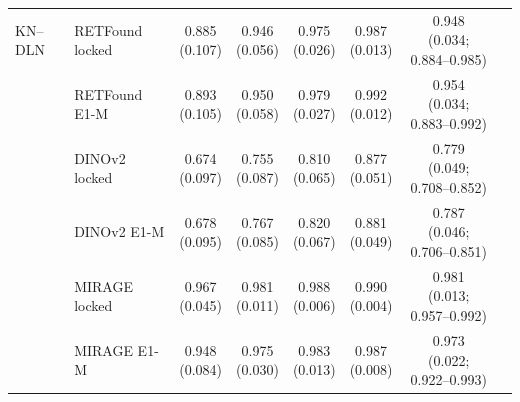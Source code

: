 \begin{longtable}{@{}llcccccp{3cm}@{}}
\addlinespace[2pt]
KN--DLN & RETFound locked & \makecell{0.885\\{\scriptsize (0.107)}} & \makecell{0.946\\{\scriptsize (0.056)}} & \makecell{0.975\\{\scriptsize (0.026)}} & \makecell{0.987\\{\scriptsize (0.013)}} & \makecell{0.948\\{\scriptsize (0.034; 0.884--0.985)}} &  \\
 & RETFound E1-M & \makecell{0.893\\{\scriptsize (0.105)}} & \makecell{0.950\\{\scriptsize (0.058)}} & \makecell{0.979\\{\scriptsize (0.027)}} & \makecell{0.992\\{\scriptsize (0.012)}} & \makecell{0.954\\{\scriptsize (0.034; 0.883--0.992)}} &  \\
 & DINOv2 locked & \makecell{0.674\\{\scriptsize (0.097)}} & \makecell{0.755\\{\scriptsize (0.087)}} & \makecell{0.810\\{\scriptsize (0.065)}} & \makecell{0.877\\{\scriptsize (0.051)}} & \makecell{0.779\\{\scriptsize (0.049; 0.708--0.852)}} &  \\
 & DINOv2 E1-M & \makecell{0.678\\{\scriptsize (0.095)}} & \makecell{0.767\\{\scriptsize (0.085)}} & \makecell{0.820\\{\scriptsize (0.067)}} & \makecell{0.881\\{\scriptsize (0.049)}} & \makecell{0.787\\{\scriptsize (0.046; 0.706--0.851)}} &  \\
 & MIRAGE locked & \makecell{0.967\\{\scriptsize (0.045)}} & \makecell{0.981\\{\scriptsize (0.011)}} & \makecell{0.988\\{\scriptsize (0.006)}} & \makecell{0.990\\{\scriptsize (0.004)}} & \makecell{0.981\\{\scriptsize (0.013; 0.957--0.992)}} &  \\
 & MIRAGE E1-M & \makecell{0.948\\{\scriptsize (0.084)}} & \makecell{0.975\\{\scriptsize (0.030)}} & \makecell{0.983\\{\scriptsize (0.013)}} & \makecell{0.987\\{\scriptsize (0.008)}} & \makecell{0.973\\{\scriptsize (0.022; 0.922--0.993)}} &  \\

\end{longtable}
